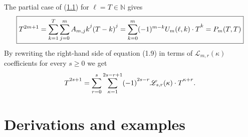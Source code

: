 \documentclass[11pt, letterpaper]{amsart} da da ya qq
\theoremstyle{definition}
\theoremstyle{remark}
\numberwithin{equation}{section}
\begin{document}
The partial case of (\hyperref[f1]{1.1}) for $\ell=T\in\mathbb{N}$ gives
\begin{equation}\label{main_identity}
\boxed
{
T^{2m+1}=\sum_{k=1}^{T}\sum_{j=0}^m A_{m,j}k\strut^j(T-k)\strut^j=\sum_{k=0}^{m}(-1)^{m-k}U_m(\ell, k)\cdot T\strut^k=P_m(T,T)
}
\end{equation}
By rewriting the right-hand side of equation (1.9) in terms of $\mathscr{L}_{m,r}(\kappa)$ coefficients for every $s\geq 0$ we get
\begin{equation}
T\strut^{2s+1}=\sum_{r=0}^{s}\sum_{\kappa=1}^{2s-r+1} (-1)\strut^{2s-r} \mathscr{L}_{s,r}(\kappa) \cdot T\strut^{\kappa+r}.
\end{equation}
\section{Derivations and examples}
\end{document}

